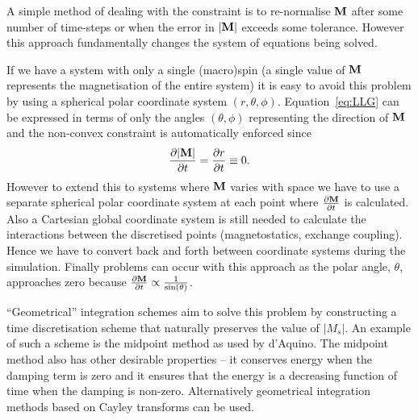 A simple method of dealing with the constraint is to re-normalise $\mathbf{M}$ after some number of time-steps or when the error in $|\mathbf{M}|$ exceeds some tolerance.\cite{Fidler2000} However this approach fundamentally changes the system of equations being solved.\cite{Lewis2003}

If we have a system with only a single (macro)spin (\ie a single value of $\mathbf{M}$ represents the magnetisation of the entire system) it is easy to avoid this problem by using a spherical polar coordinate system $(r,\theta,\phi)$. Equation~\eqref{eq:LLG} can be expressed in terms of only the angles $(\theta,\phi)$ representing the direction of $\mathbf{M}$ and the non-convex constraint is automatically enforced since
\begin{equation}
  \label{eq:40}
  \frac{\partial \lvert \mathbf{M} \rvert}{\partial t} = \frac{\partial r}{\partial t} \equiv 0.
\end{equation}
However to extend this to systems where $\mathbf{M}$ varies with space we have to use a separate spherical polar coordinate system at each point where $\frac{\partial \mathbf{M}}{\partial t}$ is calculated. Also a Cartesian global coordinate system is still needed to calculate the interactions between the discretised points (\ie magnetostatics, exchange coupling). Hence we have to convert back and forth between coordinate systems during the simulation.\cite{Scholz2003} Finally problems can occur with this approach as the polar angle, $\theta$, approaches zero because $\frac{\partial \mathbf{M}}{\partial t} \propto \frac{1}{\sin(\theta)}$.\cite{Fukushima2005}


``Geometrical'' integration schemes aim to solve this problem by constructing a time discretisation scheme that naturally preserves the value of $|M_s|$. An example of such a scheme is the midpoint method as used by d'Aquino. The midpoint method also has other desirable properties -- it conserves energy when the damping term is zero and it ensures that the energy is a decreasing function of time when the damping is non-zero.\cite{DAquino2005} Alternatively geometrical integration methods based on Cayley transforms can be used.\cite{Lewis2003}\cite{Bottauscio2011}



